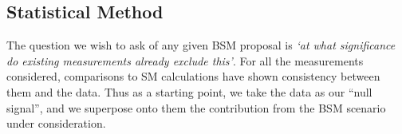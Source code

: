 \documentclass[floatfix]{article}
\begin{document}
\subsection{Statistical Method}\label{sec:statmethod}


The question we wish to ask of any given BSM proposal is {\it `at what significance do existing measurements already exclude this'}. 
For all the measurements considered, comparisons to SM calculations have shown consistency between them and the data. Thus as a starting point, we take the
data as our ``null signal'', and we superpose onto them the contribution from the BSM scenario under consideration.
\end{document}
